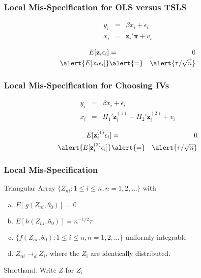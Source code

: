 \begin{frame}
	\frametitle{Local Mis-Specification for OLS versus TSLS}


	\begin{eqnarray*}
	y_{i} &=& \beta x_{i}  + \epsilon_{i}\\
	x_{i} &=& \mathbf{z}_{i}' \boldsymbol{\pi} + v_{i}
	\end{eqnarray*}

	\begin{eqnarray*}
	E[\mathbf{z}_i \epsilon_i] &=& 0\\
	\alert{E[x_i \epsilon_i]} &\alert{=}& \alert{\tau/\sqrt{n}}
	\end{eqnarray*}
\end{frame}
\begin{frame}

	\frametitle{Local Mis-Specification for Choosing IVs}

		\begin{eqnarray*}
    		y_i &=& \beta x_i +  \epsilon_i\\
    		x_i &=&  \Pi_1' \mathbf{z}_{i}^{(1)} + \Pi_2'\mathbf{z}_{i}^{(2)} + v_i
		\end{eqnarray*}

		\begin{eqnarray*}
			E[\mathbf{z}_{i}^{(1)}\epsilon_i] &=& 0\\
			\alert{E[\mathbf{z}_{i}^{(2)}\epsilon_i]} &\alert{=}& \alert{\tau/\sqrt{n}}
		\end{eqnarray*}
\end{frame}
\begin{frame}
	\frametitle{Local Mis-Specification}
Triangular Array $\{Z_{ni}\colon 1\leq i \leq n, n =1, 2, \hdots\}$  with
	\begin{enumerate}[(a)]
		\item $E[g(Z_{ni},\theta_0)] = 0$
		\item $E[h(Z_{ni},\theta_0)] = n^{-1/2}\tau$
		\item $\{f(Z_{ni},\theta_0)\colon 1\leq i \leq n, n = 1, 2, \hdots\}$ uniformly integrable
		\item $Z_{ni} \rightarrow_d Z_i$, where the $Z_i$ are identically distributed.
	\end{enumerate}

	\alert{Shorthand: Write $Z$ for $Z_i$}
\end{frame}

